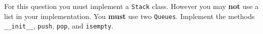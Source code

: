 \documentclass[11pt]{exam}
\begin{document}
\begin{questions}
\newpage
\question[10] For this question you must implement a \texttt{Stack} class.  However you may \textbf{not} use a list in your implementation.  You \textbf{must} use two \texttt{Queues}.  Implement the methods \verb!__init__!, \texttt{push}, \texttt{pop}, and \texttt{isempty}.
\vspace{4.5in}


\end{questions}
\end{document}
